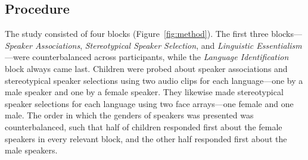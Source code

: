 \documentclass{foushee-adapted-preprint}
\begin{document}
\subsection{Procedure}
The study consisted of four blocks (Figure~\ref{fig:method}). 
The first three blocks---\textit{Speaker Associations}, \textit{Stereotypical Speaker Selection}, and \textit{Linguistic Essentialism}---were counterbalanced across participants, while the \textit{Language Identification} block always came last. 
Children were probed about speaker associations and stereotypical speaker selections using two audio clips for each language---one by a male speaker and one by a female speaker.
They likewise made stereotypical speaker selections for each language using two face arrays---one female and one male. 
The order in which the genders of speakers was presented was counterbalanced, such that half of children responded first about the female speakers in every relevant block, and the other half responded first about the male speakers. 
\end{document}
